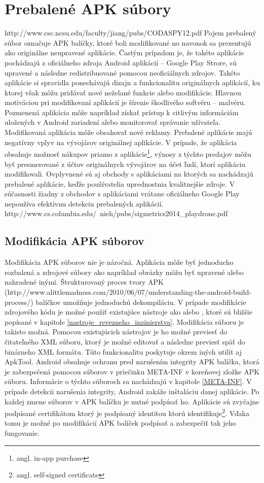\chapter{Prebalené APK súbory}
http://www.csc.ncsu.edu/faculty/jiang/pubs/CODASPY12.pdf
Pojem prebalený súbor označuje APK balíčky, ktoré boli modifikované no navonok sa prezentujú ako originálne neupravené aplikácie. Častým prípadom je, že takéto aplikácie pochádzajú z oficiálneho zdroja Android aplikácií – Google Play Strore, sú upravené a následne redistribuované pomocou neoficiálnych zdrojov. Takéto aplikácie si spravidla ponechávajú dizajn a funkcionalitu originálnych aplikácií, ku ktorej však môžu pridávať nové neželané funkcie alebo modifikácie. Hlavnou motiváciou pri modifikovaní aplikácií je šírenie škodlivého softvéru – malvéru. Pozmenená aplikácia môže napríklad získať prístup k citlivým informáciám uložených v Android zariadení alebo monitorovať správanie užívateľa. Modifikovaná aplikácia môže obsahovať nové reklamy. Prebalené aplikácie majú negatívny vplyv na vývojárov originálnej aplikácie. V prípade, že aplikácia obsahuje možnosť nákupov priamo z aplikácie\footnote{angl. in-app purchase}, výnosy z týchto predajov môžu byť presmerované z účtov originálnych vývojárov na účet ľudí, ktorí aplikáciu modifikovali. Ovplyvnené sú aj obchody s aplikáciami na ktorých sa nachádzajú prebalené aplikácie, keďže používatelia uprednostnia kvalitnejšie zdroje. V súčasnosti žiadny z obchodov s aplikáciami vrátane oficiálneho Google Play nepoužíva efektívnu detekciu prebalených aplikácií. http://www.cs.columbia.edu/~nieh/pubs/sigmetrics2014\_playdrone.pdf

\section{Modifikácia APK súborov}
Modifikácia APK súborov nie je náročná. Aplikácia môže byť jednoducho rozbalená a zdrojové súbory ako napríklad obrázky môžu byť upravené alebo nahradené inými.  Štrukturovaný proces tvory APK (http://www.alittlemadness.com/2010/06/07/understanding-the-android-build-process/) balíčkov umožňuje jednoduchú dekompiláciu. V prípade modifikácie zdrojového kódu je možné použiť existujúce nástroje ako  alebo , ktoré sú bližšie popísané v kapitole \ref{nastroje_revezneho_inzinierstva}. Modifikácia súboru  je takisto možná. Pomocou existujúcich nástrojov je ho možné previesť do čitateľného XML súboru, ktorý je možné editovať a následne previesť späť do binárneho XML formátu. Túto funkcionalitu poskytuje okrem iných utilít aj ApkTool.
Android obsahuje ochranu pred narušením integrity APK balíčka, ktorá je zabezpečená pomocou súborov v priečinku META-INF v koreňovej zložke APK súboru. Informácie o týchto súboroch sa nachádzajú v kapitole \ref{META-INF}. V prípade detekcii narušenia integrity, Android zakáže inštaláciu danej aplikácie. Po každej zmene súborov v APK balíčku je nutné podpísať ho. Aplikácie sú zvyčajne podpísané certifikátom ktorý je podpísaný identitou ktorú identifikuje\footnote{angl. self-signed certificate}. Vďaka tomu je možné po modifikácií APK balíček podpísať a zabezpečiť tak jeho fungovanie.

